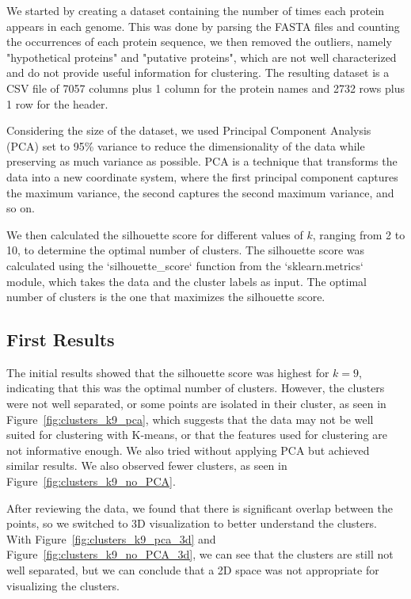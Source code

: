 We started by creating a dataset containing the number of times each protein appears in each genome. This was done by
parsing the FASTA files and counting the occurrences of each protein sequence, we then removed the outliers, namely
"hypothetical proteins" and "putative proteins", which are not well characterized and do not provide useful information
for clustering. The resulting dataset is a CSV file of 7057 columns plus 1 column for the protein names and 2732 rows
plus 1 row for the header.

Considering the size of the dataset, we used Principal Component Analysis (PCA) set to 95\% variance to reduce the dimensionality
of the data while preserving as much variance as possible. PCA is a technique that transforms the data into a new coordinate
system, where the first principal component captures the maximum variance, the second captures the second maximum variance,
and so on.

We then calculated the silhouette score for different values of $k$, ranging from 2 to 10, to determine the optimal number
of clusters. The silhouette score was calculated using the `silhouette_score` function from the `sklearn.metrics` module,
which takes the data and the cluster labels as input. The optimal number of clusters is the one that maximizes the silhouette
score.

\subsection{First Results}
\label{subsec:first_results}

The initial results showed that the silhouette score was highest for $k=9$, indicating that this was the optimal number of clusters.
However, the clusters were not well separated, or some points are isolated in their cluster, as seen in Figure~\ref{fig:clusters_k9_pca},
which suggests that the data may not be well suited for clustering with K-means, or that the features used for clustering are not
informative enough. We also tried without applying PCA but achieved similar results. We also observed fewer clusters, as seen in
Figure~\ref{fig:clusters_k9_no_PCA}.

After reviewing the data, we found that there is significant overlap between the points, so we switched to 3D visualization to better
understand the clusters. With Figure~\ref{fig:clusters_k9_pca_3d} and Figure~\ref{fig:clusters_k9_no_PCA_3d}, we can see that the
clusters are still not well separated, but we can conclude that a 2D space was not appropriate for visualizing the clusters.

